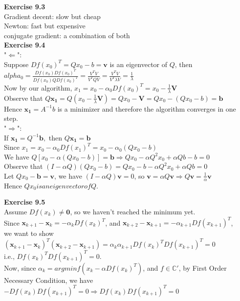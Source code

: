 \documentclass[letterpaper,12pt]{article}
\theoremstyle{definition}
\renewcommand{\vec}[1]{\mathbf{#1}}
\begin{document}
\noindent\textbf{Exercise 9.3}\\
Gradient decent: slow but cheap\\
Newton: fast but expensive\\
conjugate gradient: a combination of both\\
\noindent\textbf{Exercise 9.4}\\
"$\Leftarrow$": \\
Suppose $Df(x_0)^T=Qx_0-b=\vec{v}$ is an eigenvector of $Q$, then \\
$alpha_0=\frac{Df(x_0)Df(x_0)^T}{Df(x_0)QDf(x_0)^T}=\frac{V^TV}{V^TQV}=\frac{V^TV}{V^T\lambda V}=\frac{1}{\lambda}$\\
Now by our algorithm, $x_1=x_0-\alpha_0 Df(x_0)^T=x_0-\frac{1}{\lambda}\vec{V}$\\
Observe that $Q\vec{x_1}=Q(x_0-\frac{1}{\lambda}\vec{V})=Qx_0-\vec{V}=Qx_0-(Qx_0-b)=\vec{b}$\\
Hence $\vec{x_1}=A^{-1}b$ is a minimizer and therefore the algorithm converges in one step. \\
"$\Rightarrow$":\\
If $\vec{x_1}=Q^{-1}\vec{b},$ then $Q\vec{x_1}=\vec{b}$\\
Since $x_1=x_0-\alpha_0Df(x_1)^T=x_0-\alpha_0(Qx_0-b)$\\
We have $Q[x_0-\alpha(Qx_0-b)]=\vec{b} \Rightarrow Qx_0-\alpha Q^2x_0+\alpha Qb-b=0$\\
Observe that $(I-\alpha Q)(Qx_0-b)=Qx_0-b-\alpha Q^2x_0+\alpha Qb=0$\\
Let $Qx_0-\vec{b}=\vec{v}$, we have $(I-\alpha Q)\vec{v}=0$, so $\vec{v}=\alpha Q\vec{v} \Rightarrow Q\vec{v}=\frac{1}{\alpha}\vec{v}$\\
Hence $Qx_0 is an eigenvector of Q$.


\noindent\textbf{Exercise 9.5}\\
Assume $Df(x_k)\neq \vec{0}$, so we haven't reached the minimum yet. \\
Since $\vec{x}_{k+1}-\vec{x}_{k}=-\alpha_kDf(x_k)^T$, and $\vec{x}_{k+2}-\vec{x}_{k+1}=-\alpha_{k+1}Df(x_{k+1})^T$,\\
we want to show $(\vec{x}_{k+1}-\vec{x}_{k})^T(\vec{x}_{k+2}-\vec{x}_{k+1})=\alpha_k\alpha_{k+1}Df(x_k)^TDf(x_{k+1})^T=0$\\
i.e., $Df(x_k)^TDf(x_{k+1})^T=0$.\\
Now, since $\alpha_k=argmin f(x_k-\alpha Df(x_k)^T)$, and $f\in \mathbb{C}'$, by First Order Necessary Condition, we have $-Df(x_k)Df(x_{k+1})^T=0\Rightarrow Df(x_k)Df(x_{k+1})^T=0$\\
\end{document}
